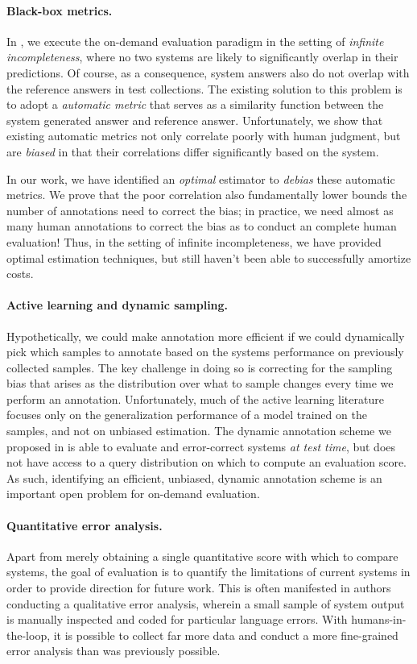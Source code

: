 \paragraph{Black-box metrics.}
In , we execute the on-demand evaluation paradigm in the setting of \textit{infinite incompleteness}, where no two systems are likely to significantly overlap in their predictions.
Of course, as a consequence, system answers also do not overlap with the reference answers in test collections.
The existing solution to this problem is to adopt a \textit{automatic metric} that serves as a similarity function between the system generated answer and reference answer.
Unfortunately, we show that existing automatic metrics not only correlate poorly with human judgment, but are \textit{biased} in that their correlations differ significantly based on the system.

In our work, we have identified an \textit{optimal} estimator to \textit{debias} these automatic metrics.
We prove that the poor correlation also fundamentally lower bounds the number of annotations need to correct the bias;
  in practice, we need almost as many human annotations to correct the bias as to conduct an complete human evaluation!
Thus, in the setting of infinite incompleteness, we have provided optimal estimation techniques, but still haven't been able to successfully amortize costs.

\paragraph{Active learning and dynamic sampling.}
Hypothetically, we could make annotation more efficient if we could dynamically pick which samples to annotate based on the systems performance on previously collected samples.
The key challenge in doing so is correcting for the sampling bias that arises as the distribution over what to sample changes every time we perform an annotation.
Unfortunately, much of the active learning literature focuses only on the generalization performance of a model trained on the samples, and not on unbiased estimation.
The dynamic annotation scheme we proposed in  is able to evaluate and error-correct systems \textit{at test time}, but does not have access to a query distribution on which to compute an evaluation score.
As such, identifying an efficient, unbiased, dynamic annotation scheme is an important open problem for on-demand evaluation.

\paragraph{Quantitative error analysis.}
Apart from merely obtaining a single quantitative score with which to compare systems, the goal of evaluation is to quantify the limitations of current systems in order to provide direction for future work.
This is often manifested in authors conducting a qualitative error analysis, wherein a small sample of system output is manually inspected and coded for particular language errors.
With humans-in-the-loop, it is possible to collect far more data and conduct a more fine-grained error analysis than was previously possible.


